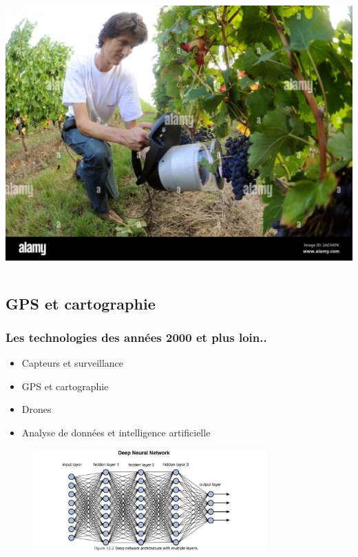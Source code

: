 \documentclass{beamer}
\begin{document}
\begin{frame}
\begin{columns}[c]
	\centering
	\includegraphics[width=\textwidth]{maturite}
	\end{columns}
	
	\end{frame}

		\subsection{GPS et cartographie}
		
		
			\begin{frame}
			\frametitle{Les technologies des années 2000 et plus loin..}
			\begin{itemize}
				\item Capteurs et surveillance
				\item \alert{GPS et cartographie}
				\item Drones
				\item Analyse de données et intelligence artificielle
			\end{itemize}
			
			\begin{figure}
				\includegraphics[width=0.8\textwidth]{neuron}
				\label{fig:example}
			\end{figure}
			
		\end{frame}
	
\end{document}
